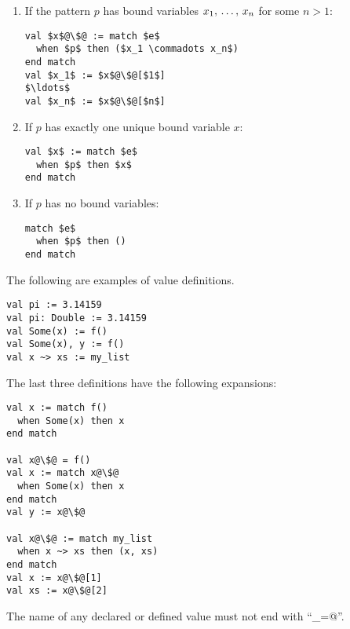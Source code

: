 \begin{enumerate}
\item
If the pattern $p$ has bound variables $x_1 ,\, \ldots ,\, x_n$ for some $n > 1$:
\begin{lstlisting}[escapechar=@]
val $x$@\$@ := match $e$
  when $p$ then ($x_1 \commadots x_n$)
end match
val $x_1$ := $x$@\$@[$1$]
$\ldots$
val $x_n$ := $x$@\$@[$n$]
\end{lstlisting}

\item
If $p$ has exactly one unique bound variable $x$:
\begin{lstlisting}
val $x$ := match $e$
  when $p$ then $x$
end match
\end{lstlisting}

\item
If $p$ has no bound variables:
\begin{lstlisting}
match $e$
  when $p$ then ()
end match
\end{lstlisting}
\end{enumerate}

\example The following are examples of value definitions. 
\begin{lstlisting}
val pi := 3.14159
val pi: Double := 3.14159
val Some(x) := f() 
val Some(x), y := f()
val x ~> xs := my_list
\end{lstlisting}

The last three definitions have the following expansions:
\begin{lstlisting}[escapechar=@]
val x := match f()
  when Some(x) then x
end match

val x@\$@ = f()
val x := match x@\$@
  when Some(x) then x
end match
val y := x@\$@

val x@\$@ := match my_list
  when x ~> xs then (x, xs)
end match
val x := x@\$@[1]
val xs := x@\$@[2]
\end{lstlisting}

The name of any declared or defined value must not end with ``\lstinline@_=@''. 

